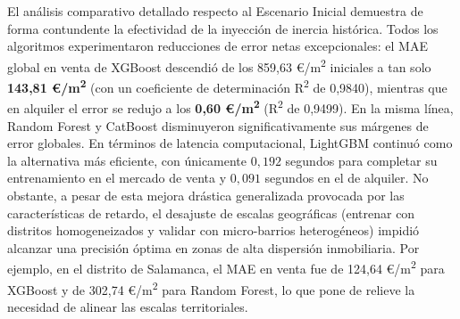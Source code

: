 \documentclass[a4paper,11pt,openany]{book}
\begin{document}
\begin{table}[H]
\centering
\caption{Matriz de rendimiento comparativa: Evaluación cruzada (distrito a barrio) con retardos temporales - Mercado de Alquiler (€/m\textsuperscript{2})}
\label{tab:phase1_crossed_alquiler}
\end{table}

El análisis comparativo detallado respecto al Escenario Inicial demuestra de forma contundente la efectividad de la inyección de inercia histórica. Todos los algoritmos experimentaron reducciones de error netas excepcionales: el MAE global en venta de XGBoost descendió de los 859,63 €/m\textsuperscript{2} iniciales a tan solo \textbf{143,81 €/m\textsuperscript{2}} (con un coeficiente de determinación R\textsuperscript{2} de 0,9840), mientras que en alquiler el error se redujo a los \textbf{0,60 €/m\textsuperscript{2}} (R\textsuperscript{2} de 0,9499). En la misma línea, Random Forest y CatBoost disminuyeron significativamente sus márgenes de error globales. En términos de latencia computacional, LightGBM continuó como la alternativa más eficiente, con únicamente $0,192$ segundos para completar su entrenamiento en el mercado de venta y $0,091$ segundos en el de alquiler. No obstante, a pesar de esta mejora drástica generalizada provocada por las características de retardo, el desajuste de escalas geográficas (entrenar con distritos homogeneizados y validar con micro-barrios heterogéneos) impidió alcanzar una precisión óptima en zonas de alta dispersión inmobiliaria. Por ejemplo, en el distrito de Salamanca, el MAE en venta fue de 124,64 €/m\textsuperscript{2} para XGBoost y de 302,74 €/m\textsuperscript{2} para Random Forest, lo que pone de relieve la necesidad de alinear las escalas territoriales.
\end{document}
